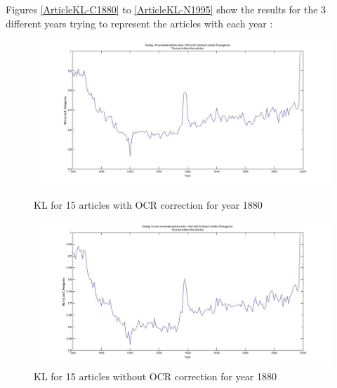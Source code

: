 Figures \ref{ArticleKL-C1880} to \ref{ArticleKL-N1995} show the results for the 3 different years trying to represent the articles with each year :

\begin{figure}[h!]
    \begin{minipage}[b]{0.48\linewidth}
        \includegraphics[scale=0.15]{Pictures/date_articles/kullback_leibler/15articles_1880_KL_years_simulate_articles_corrected_without_articles.jpg}
        \caption{KL for 15 articles with OCR correction for year 1880}
        \label{ArticleKL-C1880}
    \end{minipage}\hfill
    \begin{minipage}[b]{0.5\linewidth}
        \includegraphics[scale=0.15]{Pictures/date_articles/kullback_leibler/15articles_1880_KL_years_simulate_articles_without_correction_without_articles.jpg}
        \caption{KL for 15 articles without OCR correction for year 1880}
        \label{ArticleKL-N1880}
    \end{minipage}\hfill
\end{figure}

